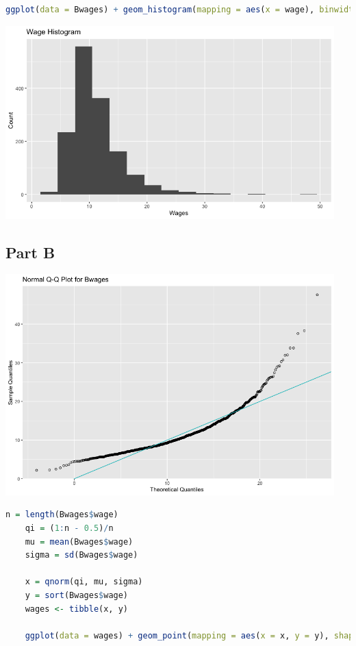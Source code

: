 \documentclass[letterpaper]{article}
\begin{document}
\begin{lstlisting}[language=R]
    ggplot(data = Bwages) + geom_histogram(mapping = aes(x = wage), binwidth = 3) + xlab("Wages") + ylab("Count") + ggtitle("Wage Histogram")
\end{lstlisting}

\begin{center}
    \includegraphics[width=5in]{wageHistogram.png}
\end{center}

\subsection*{Part B}

\begin{center}
    \includegraphics[width=5in]{QQPlot.png}
\end{center}

\begin{lstlisting}[language=R]
    n = length(Bwages$wage)
    qi = (1:n - 0.5)/n
    mu = mean(Bwages$wage)
    sigma = sd(Bwages$wage)

    x = qnorm(qi, mu, sigma)
    y = sort(Bwages$wage)
    wages <- tibble(x, y)

    ggplot(data = wages) + geom_point(mapping = aes(x = x, y = y), shape = 1) + geom_abline(intercept = 0, slope = 1) + xlab("Theoretical Quantiles") + ylab("Sample Quantiles") + ggtitle("Normal Q-Q Plot for Bwages")
\end{lstlisting}
\end{document}
